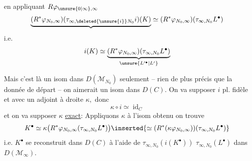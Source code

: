 en appliquant \(R\varphi_{\unsure{0|\infty},\infty}\)
\[
\underbrace{(R^*\varphi_{N_0,\infty})(\tau_{\infty,\deleted{\unsure{i}}N_0}i)(K)}
\simeq(R^*\varphi_{N_0,\infty})(\tau_{\infty,N_0}L^\bullet)
\]
i.e.
\[
i(K)\simeq\underbrace{(R^*\varphi_{N_0,\infty})(\tau_{\infty,N_0}L^\bullet)}_{\unsure{L'^\bullet|L'}}
\]

Mais c'est là un isom dans \(D(\mathcal M_{N_0})\) seulement -- rien de plus précis que la donnée de départ -- on aimerait un isom dans \(D(C).\) On va supposer \(i\) pl. fidèle et avec un adjoint à droite \(\kappa,\) donc
\[
\kappa\circ i\simeq\operatorname{id}_C
\]
et on va supposer \(\kappa\) \uline{exact}: Appliquons \(\kappa\) à l'isom obtenu on trouve
\[
K^\bullet\simeq\kappa\bigl(R^*\varphi_{N_0,\infty}(\tau_{\infty,N_0}L^\bullet)\bigr)
\inserted{\simeq(R^*(\kappa\varphi_{N_0,\infty}))(\tau_{\infty,N_0}L^\bullet)}
\]
i.e. \(K^\bullet\) se reconstruit dans \(D(C)\) à l'aide de \(\tau_{\infty,N_0}(i(K^\bullet))\)  \(\tau_{\infty,N_0}(L^\bullet)\) dans \(D(\mathcal M_\infty).\)
